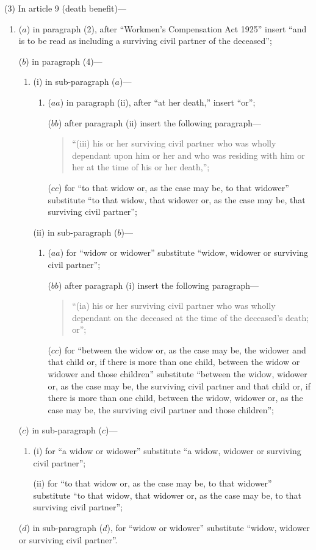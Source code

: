 \documentclass[12pt,a4paper]{article}
\begin{document}
(3) In article 9 (death benefit)—
\begin{enumerate}\item[]
($a$) in paragraph (2), after “Workmen’s Compensation Act 1925” insert “and is to be read as including a surviving civil partner of the deceased”;

($b$) in paragraph (4)—
\begin{enumerate}\item[]
(i) in sub-paragraph ($a$)—
\begin{enumerate}\item[]
($aa$) in paragraph (ii), after “at her death,” insert “or”;

($bb$) after paragraph (ii)  insert the following paragraph—
\begin{quotation}
\begin{sloppypar}
“(iii) his or her surviving civil partner who was wholly dependant upon him or her and who was residing with him or her at the time of his or her death,”;
\end{sloppypar}
\end{quotation}

($cc$) for “to that widow or, as the case may be, to that widower” substitute “to that widow, that widower or, as the case may be, that surviving civil partner”;
\end{enumerate}

(ii) in sub-paragraph ($b$)—
\begin{enumerate}\item[]
($aa$) for “widow or widower” substitute “widow, widower or surviving civil partner”;

($bb$) after paragraph (i)  insert the following paragraph—
\begin{quotation}
“(ia) his or her surviving civil partner who was wholly dependant on the deceased at the time of the deceased’s death; or”;
\end{quotation}

($cc$) for “between the widow or, as the case may be, the widower and that child or, if there is more than one child, between the widow or widower and those children” substitute “between the widow, widower or, as the case may be, the surviving civil partner and that child or, if there is more than one child, between the widow, widower or, as the case may be, the surviving civil partner and those children”;
\end{enumerate}
\end{enumerate}

($c$) in sub-paragraph ($c$)—
\begin{enumerate}\item[]
(i) for “a widow or widower” substitute “a widow, widower or surviving civil partner”;

(ii) for “to that widow or, as the case may be, to that widower” substitute “to that widow, that widower or, as the case may be, to that surviving civil partner”;
\end{enumerate}

($d$) in sub-paragraph ($d$), for “widow or widower” substitute “widow, widower or surviving civil partner”.
\end{enumerate}
\end{document}
